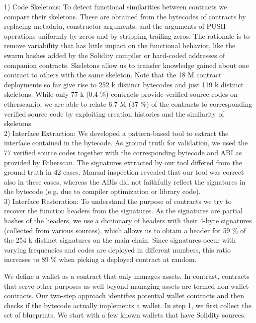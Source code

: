 \documentclass[12pt]{article}
\begin{document}
1) Code Skeletons: To detect functional similarities between contracts we compare their skeletons. These are obtained from the bytecodes of contracts by replacing metadata, constructor arguments, and the arguments of PUSH
operations uniformly by zeros and by stripping trailing zeros.
The rationale is to remove variability that has little impact
on the functional behavior, like the swarm hashes added by
the Solidity compiler or hard-coded addresses of companion
contracts. Skeletons allow us to transfer knowledge gained
about one contract to others with the same skeleton. Note
that the 18 M contract deployments so far give rise to 252 k
distinct bytecodes and just 119 k distinct skeletons. While
only 77 k (0.4 \%) contracts provide verified source codes on
etherscan.io, we are able to relate 6.7 M (37 \%) of the
contracts to corresponding verified source code by exploiting
creation histories and the similarity of skeletons.
\\
2) Interface Extraction: We developed a pattern-based tool
to extract the interface contained in the bytecode. As ground
truth for validation, we used the 77  verified source codes
together with the corresponding bytecode and ABI as provided
by Etherscan. The signatures extracted by our tool differed
from the ground truth in 42 cases. Manual inspection revealed
that our tool was correct also in these cases, whereas the ABIs
did not faithfully reflect the signatures in the bytecode (e.g.
due to compiler optimization or library code).
\\
3) Interface Restoration: To understand the purpose of
contracts we try to recover the function headers from the
signatures. As the signatures are partial hashes of the headers,
we use a dictionary of headers with their 4-byte signatures
(collected from various sources), which allows us to obtain a
header for 59 \% of the 254 k distinct signatures on the main
chain. Since signatures occur with varying frequencies and
codes are deployed in different numbers, this ratio increases
to 89 \% when picking a deployed contract at random.
\par
We define a wallet as a contract that only manages assets.
In contrast, contracts that serve other purposes as well beyond
managing assets are termed non-wallet contracts.
Our two-step approach identifies potential wallet contracts
and then checks if the bytecode actually implements a wallet.
In step 1, we first collect the set of blueprints. We start with
a few known wallets that have Solidity sources.

 
\end{document}
